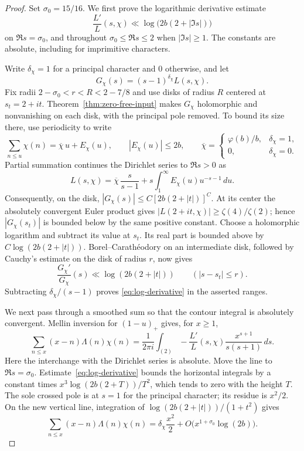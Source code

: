 \begin{proof}
Set $\sigma_0=15/16$.  We first prove the logarithmic derivative estimate
\begin{equation}\label{eq:log-derivative}
 \frac{L'}{L}(s,\chi)\ll\log\bigl(2b(2+|\Im s|)\bigr)
\end{equation}
on $\Re s=\sigma_0$, and throughout $\sigma_0\le\Re s\le2$ when
$|\Im s|\ge1$.  The constants are absolute, including for imprimitive
characters.

Write $\delta_\chi=1$ for a principal character and $0$ otherwise, and
let
\[
 G_\chi(s)=(s-1)^{\delta_\chi}L(s,\chi).
\]
Fix radii
$2-\sigma_0<r<R<2-7/8$ and use disks of radius $R$ centered at
$s_t=2+it$.  Theorem~\ref{thm:zero-free-input} makes $G_\chi$
holomorphic and nonvanishing on each disk, with the principal pole
removed.  To bound its size there, use periodicity to write
\[
 \sum_{n\le u}\chi(n)=\overline\chi\,u+E_\chi(u),\qquad
 |E_\chi(u)|\le2b,\qquad
 \overline\chi=\begin{cases}\varphi(b)/b,&\delta_\chi=1,\\0,&\delta_\chi=0.
 \end{cases}
\]
Partial summation continues the Dirichlet series to $\Re s>0$ as
\[
 L(s,\chi)=\overline\chi\,\frac{s}{s-1}
       +s\int_1^\infty E_\chi(u)u^{-s-1}\,du.
\]
Consequently, on the disk,
$|G_\chi(s)|\le C[2b(2+|t|)]^C$.  At its center the absolutely
convergent Euler product gives $|L(2+it,\chi)|\ge\zeta(4)/\zeta(2)$;
hence $|G_\chi(s_t)|$ is bounded below by the same positive constant.
Choose a holomorphic logarithm and subtract its value at $s_t$.
Its real part is bounded above by
$C\log(2b(2+|t|))$.  Borel--Carath\'eodory on an intermediate disk,
followed by Cauchy's estimate on the disk of radius $r$, now gives
\[
 \frac{G_\chi'}{G_\chi}(s)
 \ll\log(2b(2+|t|))\qquad (|s-s_t|\le r).
\]
Subtracting $\delta_\chi/(s-1)$ proves
\eqref{eq:log-derivative} in the asserted ranges.

We next pass through a smoothed sum so that the contour integral is
absolutely convergent.  Mellin inversion for $(1-u)_+$ gives, for $x\ge1$,
\begin{equation}\label{eq:smoothed-character-primes}
 \sum_{n\le x}(x-n)\Lambda(n)\chi(n)
 =\frac{1}{2\pi i}\int_{(2)}
   -\frac{L'}{L}(s,\chi)\frac{x^{s+1}}{s(s+1)}\,ds.
\end{equation}
Here the interchange with the Dirichlet series is absolute.  Move the
line to $\Re s=\sigma_0$.  Estimate~\eqref{eq:log-derivative} bounds
the horizontal integrals by a constant times
$x^3\log(2b(2+T))/T^2$, which tends to zero with the height $T$.
The sole crossed pole is at $s=1$ for the principal character; its
residue is $x^2/2$.  On the new vertical line, integration of
$\log(2b(2+|t|))/(1+t^2)$ gives
\begin{equation}\label{eq:smoothed-character-result}
 \sum_{n\le x}(x-n)\Lambda(n)\chi(n)
 =\delta_\chi\frac{x^2}{2}
      +O\bigl(x^{1+\sigma_0}\log(2b)\bigr).
\end{equation}


\end{proof}
